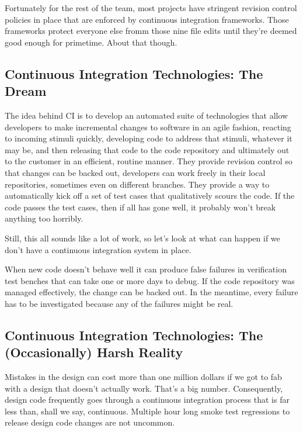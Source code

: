 \documentclass[twocolumn,letterpaper]{IEEEAerospaceCLS}  %
\begin{document}
Fortunately for the rest of the team, most projects have stringent revision control policies in place that are enforced by continuous integration frameworks. Those frameworks protect everyone else fromm those nine file edits until they're deemed good enough for primetime. About that though.

\subsection{Continuous Integration Technologies: The Dream}
The idea behind CI is to develop an automated suite of technologies that allow developers to make incremental changes to software in an agile fashion, reacting to incoming stimuli quickly, developing code to address  that stimuli, whatever it may be, and then releasing that code to the code repository and ultimately out to the customer in an efficient, routine manner.  They provide revision control so that changes can be backed out, developers can work freely in their local repositories, sometimes even on different branches. They provide a way to automatically kick off a set of test cases that qualitatively scours the code. If the code passes the test cases, then if all has gone well, it probably won't break anything too horribly.

Still, this all sounds like a lot of work, so let's look at what can happen if we don't have a continuous integration system in place.

When new code doesn't behave well it can produce false failures in verification test benches that can take one or more days to debug. If the code repository was managed effectively, the change can be backed out. In the meantime, every failure has to be investigated because any of the failures might be real.

\subsection{Continuous Integration Technologies: The (Occasionally) Harsh Reality}
Mistakes in the design can cost more than one million dollars if we got to fab with a design that doesn't actually work. That's a big number. Consequently, design code frequently goes through a continuous integration process that is far less than, shall we say, continuous. Multiple hour long  smoke test regressions to release design code changes are not uncommon.
\end{document}
